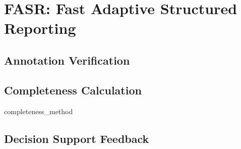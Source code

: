 \chapter{FASR: Fast Adaptive Structured Reporting}


\section{Annotation Verification}

\section{Completeness Calculation}
{completeness_method}

\section{Decision Support Feedback}

